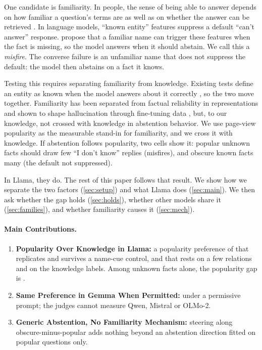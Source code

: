 \documentclass[manuscript,screen,review,anonymous,nonacm]{acmart}
\newcommand{\idk}{``I don't know''}
\begin{document}
One candidate is familiarity. In people, the sense of being able to answer depends on how familiar a question's terms are as well as on whether the answer can be retrieved \cite{reder1992,schwartz1992,koriat2001cascade}. In language models, ``known entity'' features suppress a default ``can't answer'' response. \citet{lindsey2025biology} propose that a familiar name can trigger these features when the fact is missing, so the model answers when it should abstain. We call this a \emph{misfire}. The converse failure is an unfamiliar name that does not suppress the default: the model then abstains on a fact it knows.

Testing this requires separating familiarity from knowledge. Existing tests define an entity as known when the model answers about it correctly \cite{ferrando2025iknow}, so the two move together. Familiarity has been separated from factual reliability in representations \cite{brzezinka2026bielik} and shown to shape hallucination through fine-tuning data \cite{kang2025unfamiliar}, but, to our knowledge, not crossed with knowledge in abstention behavior. We use page-view popularity as the measurable stand-in for familiarity, and we cross it with knowledge. If abstention follows popularity, two cells show it: popular unknown facts should draw few \idk{} replies (misfires), and obscure known facts many (the default not suppressed).

In Llama, they do. The rest of this paper follows that result. We show how we separate the two factors (\cref{sec:setup}) and what Llama does (\cref{sec:main}). We then ask whether the gap holds (\cref{sec:holds}), whether other models share it (\cref{sec:families}), and whether familiarity causes it (\cref{sec:mech}).

\paragraph{Main Contributions.}
\begin{enumerate}
\item \textbf{Popularity Over Knowledge in Llama:} a popularity preference of \hmLlamaDiff{} \hmLlamaDiffCI{} that replicates and survives a name-cue control, and that rests on a few relations and on the knowledge labels. Among unknown facts alone, the popularity gap is \rcUnk{} \rcUnkCI.
\item \textbf{Same Preference in Gemma When Permitted:} \pmGemmaDiff{} \pmGemmaDiffCI{} under a permissive prompt; the judges cannot measure Qwen, Mistral or OLMo-2.
\item \textbf{Generic Abstention, No Familiarity Mechanism:} steering along obscure-minus-popular adds nothing beyond an abstention direction fitted on popular questions only.
\end{enumerate}
\end{document}
